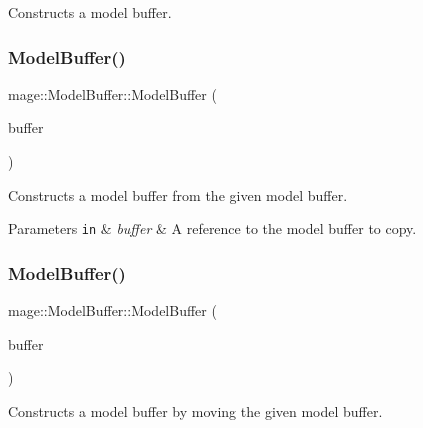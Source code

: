 Constructs a model buffer. \hypertarget{structmage_1_1_model_buffer_a593635ac135a8390b606e5e47174d2e5}{}\label{structmage_1_1_model_buffer_a593635ac135a8390b606e5e47174d2e5} 
\subsubsection{\texorpdfstring{Model\+Buffer()}{ModelBuffer()}\hspace{0.1cm}{\footnotesize\ttfamily [2/3]}}
{\footnotesize\ttfamily mage\+::\+Model\+Buffer\+::\+Model\+Buffer (\begin{DoxyParamCaption}\item[{const \hyperlink{structmage_1_1_model_buffer}{Model\+Buffer} \&}]{buffer }\end{DoxyParamCaption})\hspace{0.3cm}{\ttfamily [default]}}

Constructs a model buffer from the given model buffer.


\begin{DoxyParams}[1]{Parameters}
\mbox{\tt in}  & {\em buffer} & A reference to the model buffer to copy. \\
\hline
\end{DoxyParams}
\hypertarget{structmage_1_1_model_buffer_a56ec1df93cbf6505c513cf5f440fdc4f}{}\label{structmage_1_1_model_buffer_a56ec1df93cbf6505c513cf5f440fdc4f} 
\subsubsection{\texorpdfstring{Model\+Buffer()}{ModelBuffer()}\hspace{0.1cm}{\footnotesize\ttfamily [3/3]}}
{\footnotesize\ttfamily mage\+::\+Model\+Buffer\+::\+Model\+Buffer (\begin{DoxyParamCaption}\item[{\hyperlink{structmage_1_1_model_buffer}{Model\+Buffer} \&\&}]{buffer }\end{DoxyParamCaption})\hspace{0.3cm}{\ttfamily [default]}}

Constructs a model buffer by moving the given model buffer.


